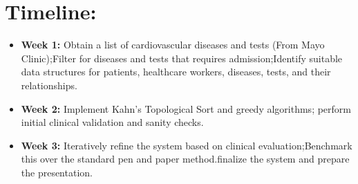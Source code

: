 \section{Timeline:}
\begin{itemize}
    \item \textbf{Week 1:} Obtain a list of cardiovascular diseases and tests (From Mayo Clinic);Filter for diseases and tests that requires admission;Identify suitable data structures for patients, healthcare workers, diseases, tests, and their relationships.
    \item \textbf{Week 2:} Implement Kahn's Topological Sort and greedy algorithms; perform initial clinical validation and sanity checks.
    \item \textbf{Week 3:} Iteratively refine the system based on clinical evaluation;Benchmark this over the standard pen and paper method.finalize the system and prepare the presentation.
\end{itemize}